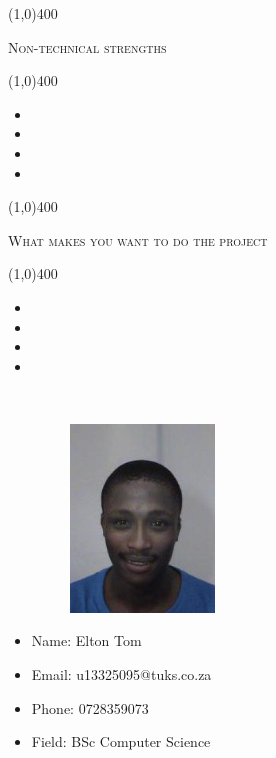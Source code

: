 \documentclass[12pt,a4paper]{report}
\begin{document}
	\begin{center}
	
	\line(1,0){400}\\
	{\scshape\large Non-technical strengths\par}
	\line(1,0){400}\\
	\end{center}
		\begin{itemize}
\item 
\item 
\item 
\item 
\end{itemize}

\begin{center}
	
	\line(1,0){400}\\
	{\scshape\large What makes you want to do the project\par}
	\line(1,0){400}\\
	\end{center}
		\begin{itemize}
\item 
\item 
\item 
\item 
\end{itemize}

\newpage
\vspace*{-3cm}\
\begin{minipage}{0.5\textwidth}
\begin{figure}[H]
\includegraphics[width=5cm,height=5cm,keepaspectratio]{u13325095.jpeg}
\end{figure}
\end{minipage} \hfill
\begin{minipage}{0.6\textwidth}
\begin{itemize}
\item[] Name: Elton Tom
\item[] Email: u13325095@tuks.co.za
\item[] Phone: 0728359073
\item[] Field: BSc Computer Science
\end{itemize}
\end{minipage}
\end{document}
